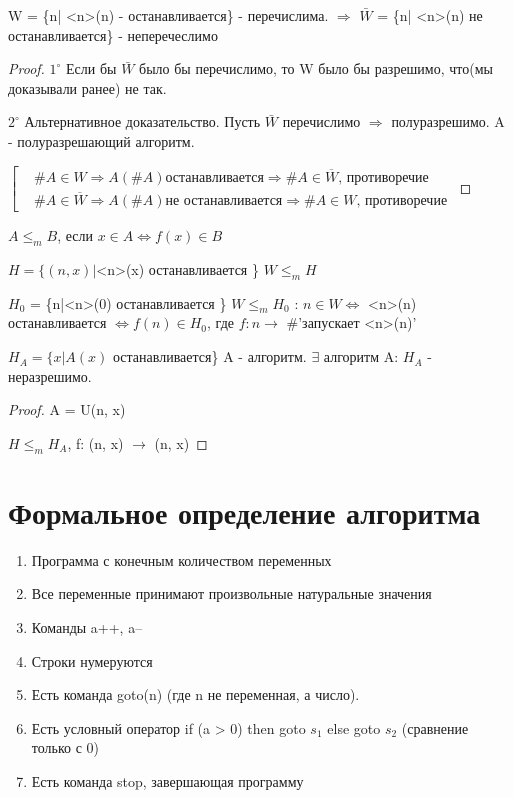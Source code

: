 
W = \{n| <n>(n) - останавливается\} - перечислима. $\Rightarrow$ $\bar{W}$ = \{n| <n>(n) не останавливается\} - неперечеслимо
\begin{proof}
	$1^{\circ}$ Если бы $\bar{W}$ было бы перечислимо, то W было бы разрешимо, что(мы доказывали ранее) не так.

	$2^{\circ}$ Альтернативное доказательство. Пусть $\bar{W}$ перечислимо $\Rightarrow$ полуразрешимо. A - полуразрешающий алгоритм.


	$\left[
		\begin{aligned}
		&\#A \in W \Rightarrow A(\#A) \text{останавливается} \Rightarrow \#A \in \overline{W}\text{, противоречие} \\
		&\#A \in \overline{W} \Rightarrow A(\#A) \text{не останавливается} \Rightarrow \#A \in W\text{, противоречие}
		\end{aligned}
	\right.$

\end{proof}

$A \le_m B$, если $x \in A \Leftrightarrow f(x) \in B$

$H = \{(n, x)|$<n>(x) останавливается \}  $W \le_m H$

$H_0$ = \{n|<n>(0) останавливается \} $W \le_m H_0$ : $n\in W \Leftrightarrow$ <n>(n) останавливается $\Leftrightarrow f(n) \in H_0$, где
$f: n \rightarrow $ \#'запускает <n>(n)'

\begin{assertion}
	$H_A = \{x|A(x)$ останавливается\} A - алгоритм. $\exists$ алгоритм A: $H_A$ - неразрешимо.
\end{assertion}
\begin{proof}
	A = U(n, x) 
	
	$H \le_m H_A$, f: (n, x) $\rightarrow$ (n, x)
\end{proof}

\section{Формальное определение алгоритма}
\begin{enumerate}
	\item Программа с конечным количеством переменных
	\item Все переменные принимают произвольные натуральные значения
	\item Команды a++, a--
	\item Строки нумеруются
	\item Есть команда goto(n) (где n не переменная, а число).
	\item Есть условный оператор if (a > 0) then goto $s_1$ else goto $s_2$ (сравнение только с 0)
	\item Есть команда stop, завершающая программу
\end{enumerate}

